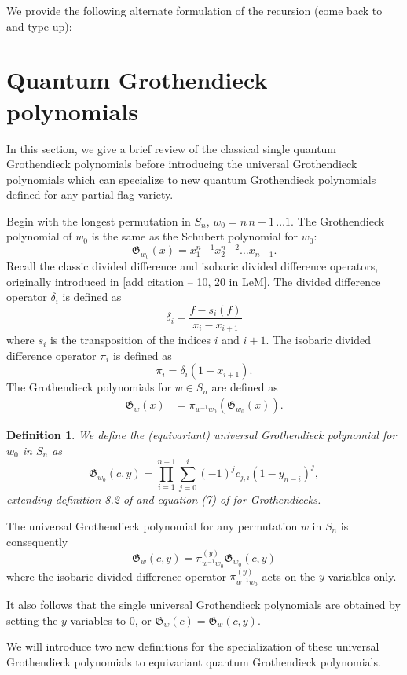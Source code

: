 \documentclass[12pt]{amsart}
\newtheorem{mydef}[thm]{\bf Definition}
\theoremstyle{remark}
\begin{document}
We provide the following alternate formulation of the recursion (come back to and type up):


\section{Quantum Grothendieck polynomials}
In this section, we give a brief review of the classical single quantum Grothendieck polynomials before introducing the universal Grothendieck polynomials which can specialize to new quantum Grothendieck polynomials defined for any partial flag variety. 

Begin with the longest permutation in $S_n$, $w_0 = n \, n-1 \, \dots 1$. The Grothendieck polynomial of $w_0$ is the same as the Schubert polynomial for $w_0$:
\[
    \mathfrak{G}_{w_0}(x) = x_1^{n-1} x_2^{n-2} \dots x_{n-1}.
\]
Recall the classic divided difference and isobaric divided difference operators, originally introduced in [add citation -- 10, 20 in LeM]. The divided difference operator $\delta_i$ is defined as
\[ 
    \delta_i = \frac{f - s_i(f)}{x_i - x_{i+1}}
\]
where $s_i$ is the transposition of the indices $i$ and $i+1$. The isobaric divided difference operator $\pi_i$ is defined as
\[
    \pi_i = \delta_i(1-x_{i+1}).
\]
The Grothendieck polynomials for $w \in S_n$ are defined as
\begin{align*}
    \mathfrak{G}_w(x) &= \pi_{w^{-1}w_0}(\mathfrak{G}_{w_0}(x)).
\end{align*}

\begin{mydef}
We define the (equivariant) universal Grothendieck polynomial for $w_0$ in $S_n$ as
\[
    \mathfrak{G}_{w_0}(c, y) = \prod\limits_{i=1}^{n-1}\sum\limits_{j=0}^i (-1)^jc_{j, i}(1-y_{n-i})^j,
\]
extending definition 8.2 of \cite{lm} and equation (7) of \cite{fulton} for Grothendiecks.
\end{mydef}

The universal Grothendieck polynomial for any permutation $w$ in $S_n$ is consequently
\[
    \mathfrak{G}_w(c, y) = \pi_{w^{-1}w_0}^{(y)} \mathfrak{G}_{w_0}(c, y)
\]
where the isobaric divided difference operator $\pi_{w^{-1}w_0}^{(y)}$ acts on the $y$-variables only. 

It also follows that the single universal Grothendieck polynomials are obtained by setting the $y$ variables to $0$, or $\mathfrak{G}_w(c) = \mathfrak{G}_w(c, y)$.

We will introduce two new definitions for the specialization of these universal Grothendieck polynomials to equivariant quantum Grothendieck polynomials.
\end{document}
